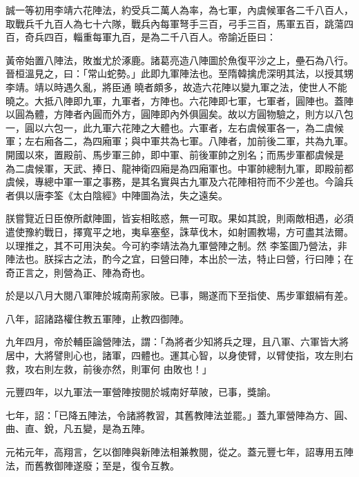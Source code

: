 \begin{pinyinscope}
 誠一等初用李靖六花陣法，約受兵二萬人為率，為七軍，內虞候軍各二千八百人，取戰兵千九百人為七十六隊，戰兵內每軍弩手三百，弓手三百，馬軍五百，跳蕩四百，奇兵四百，輜重每軍九百，是為二千八百人。帝諭近臣曰：



 黃帝始置八陣法，敗蚩尤於涿鹿。諸葛亮造八陣圖於魚復平沙之上，壘石為八行。晉桓溫見之，曰：「常山蛇勢。」此即九軍陣法也。至隋韓擒虎深明其法，以授其甥李靖。靖以時遇久亂，將臣通
 曉者頗多，故造六花陣以變九軍之法，使世人不能曉之。大抵八陣即九軍，九軍者，方陣也。六花陣即七軍，七軍者，圓陣也。蓋陣以圓為體，方陣者內圓而外方，圓陣即內外俱圓矣。故以方圓物驗之，則方以八包一，圓以六包一，此九軍六花陣之大體也。六軍者，左右虞候軍各一，為二虞候軍；左右廂各二，為四廂軍；與中軍共為七軍。八陣者，加前後二軍，共為九軍。開國以來，置殿前、馬步軍三帥，即中軍、前後軍帥之別名；而馬步軍都虞候是
 為二虞候軍，天武、捧日、龍神衛四廂是為四廂軍也。中軍帥總制九軍，即殿前都虞候，專總中軍一軍之事務，是其名實與古九軍及六花陣相符而不少差也。今論兵者俱以唐李筌《太白陰經》中陣圖為法，失之遠矣。



 朕嘗覽近日臣僚所獻陣圖，皆妄相眩惑，無一可取。果如其說，則兩敵相遇，必須遣使豫約戰日，擇寬平之地，夷阜塞壑，誅草伐木，如射圃教場，方可盡其法爾。以理推之，其不可用決矣。今可約李靖法為九軍營陣之制。然
 李筌圖乃營法，非陣法也。朕採古之法，酌今之宜，曰營曰陣，本出於一法，特止曰營，行曰陣；在奇正言之，則營為正、陣為奇也。



 於是以八月大閱八軍陣於城南荊家陂。已事，賜遂而下至指使、馬步軍銀絹有差。



 八年，詔諸路權住教五軍陣，止教四御陣。



 九年四月，帝於輔臣論營陣法，謂：「為將者少知將兵之理，且八軍、六軍皆大將居中，大將譬則心也，諸軍，四體也。運其心智，以身使臂，以臂使指，攻左則右救，攻右則左救，前後亦然，則軍何
 由敗也！」



 元豐四年，以九軍法一軍營陣按閱於城南好草陂，已事，獎諭。



 七年，詔：「已降五陣法，令諸將教習，其舊教陣法並罷。」蓋九軍營陣為方、圓、曲、直、銳，凡五變，是為五陣。



 元祐元年，高翔言，乞以御陣與新陣法相兼教閱，從之。蓋元豐七年，詔專用五陣法，而舊教御陣遂廢；至是，復令互教。




\end{pinyinscope}
